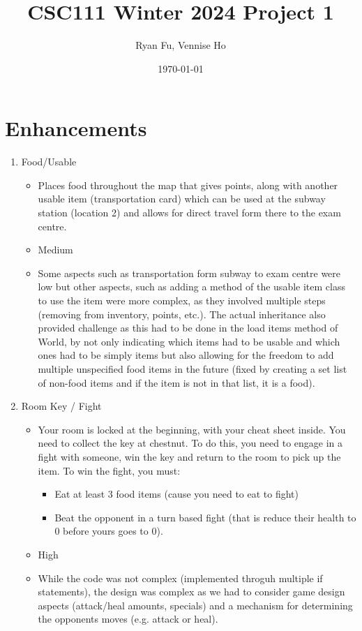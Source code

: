 \documentclass[11pt]{article}
\title{CSC111 Winter 2024 Project 1}
\author{Ryan Fu, Vennise Ho}
\date{\today}
\begin{document}
\maketitle

\section*{Enhancements}


\begin{enumerate}

\item Food/Usable
	\begin{itemize}
	\item Places food throughout the map that gives points, along with another usable item (transportation card) which can be used at the subway station (location 2) and allows for direct travel form there to the exam centre.
	\item Medium
	\item Some aspects such as transportation form subway to exam centre were low but other aspects, such as adding a method of the usable item class to use the item were more complex, as they involved multiple steps (removing from inventory, points, etc.). The actual inheritance also provided challenge as this had to be done in the load items method of World, by not only indicating which items had to be usable and which ones had to be simply items but also allowing for the freedom to add multiple unspecified food items in the future (fixed by creating a set list of non-food items and if the item is not in that list, it is a food).
	\end{itemize}


\item Room Key / Fight
	\begin{itemize}
	\item Your room is locked at the beginning, with your cheat sheet inside. You need to collect the key at chestnut. To do this, you need to engage in a fight with someone, win the key and return to the room to pick up the item. To win the fight, you must:
            \begin{itemize}
            \item Eat at least 3 food items (cause you need to eat to fight)
            \item Beat the opponent in a turn based fight (that is reduce their health to 0 before yours goes to 0).
            \end{itemize}
	\item High
	\item While the code was not complex (implemented throguh multiple if statements), the design was complex as we had to consider game design aspects (attack/heal amounts, specials) and a mechanism for determining the opponents moves (e.g. attack or heal).
	\end{itemize}



\end{enumerate}
\end{document}
